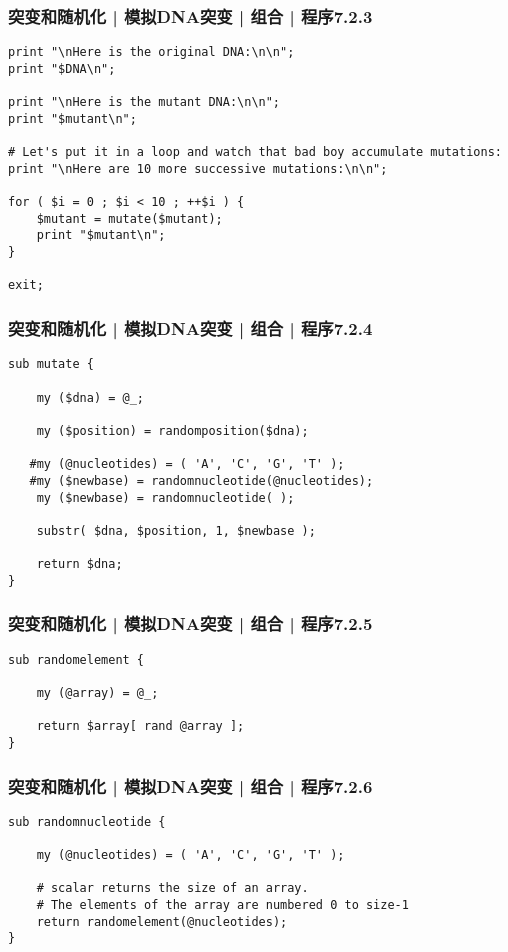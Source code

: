 \begin{frame}[fragile]
  \frametitle{突变和随机化 | 模拟DNA突变 | 组合 | 程序7.2.3}
\begin{lstlisting}[firstnumber=27]
print "\nHere is the original DNA:\n\n";
print "$DNA\n";

print "\nHere is the mutant DNA:\n\n";
print "$mutant\n";

# Let's put it in a loop and watch that bad boy accumulate mutations:
print "\nHere are 10 more successive mutations:\n\n";

for ( $i = 0 ; $i < 10 ; ++$i ) {
    $mutant = mutate($mutant);
    print "$mutant\n";
}

exit;
\end{lstlisting}
\end{frame}

\begin{frame}[fragile]
  \frametitle{突变和随机化 | 模拟DNA突变 | 组合 | 程序7.2.4}
\begin{lstlisting}[firstnumber=54]
sub mutate {

    my ($dna) = @_;

    my ($position) = randomposition($dna);

   #my (@nucleotides) = ( 'A', 'C', 'G', 'T' );
   #my ($newbase) = randomnucleotide(@nucleotides);
    my ($newbase) = randomnucleotide( );

    substr( $dna, $position, 1, $newbase );

    return $dna;
}
\end{lstlisting}
\end{frame}

\begin{frame}[fragile]
  \frametitle{突变和随机化 | 模拟DNA突变 | 组合 | 程序7.2.5}
\begin{lstlisting}[firstnumber=80]
sub randomelement {

    my (@array) = @_;

    return $array[ rand @array ];
}
\end{lstlisting}
\end{frame}

\begin{frame}[fragile]
  \frametitle{突变和随机化 | 模拟DNA突变 | 组合 | 程序7.2.6}
\begin{lstlisting}[firstnumber=94]
sub randomnucleotide {

    my (@nucleotides) = ( 'A', 'C', 'G', 'T' );

    # scalar returns the size of an array.
    # The elements of the array are numbered 0 to size-1
    return randomelement(@nucleotides);
}
\end{lstlisting}
\end{frame}

